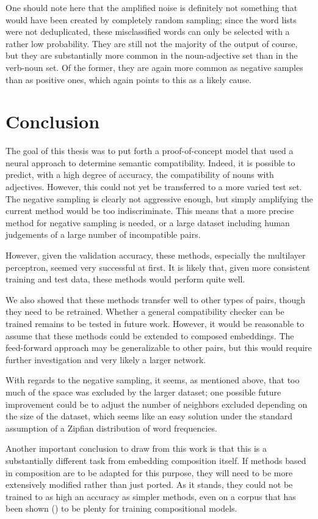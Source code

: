 \documentclass[a4paper, 12pt]{article}
\begin{document}
One should note here that the amplified noise is definitely not something that would have been created by completely random sampling; since the word lists were not deduplicated, these misclassified words can only be selected with a rather low probability. They are still not the majority of the output of course, but they are substantially more common in the noun-adjective set than in the verb-noun set. Of the former, they are again more common as negative samples than as positive ones, which again points to this as a likely cause.


\section{Conclusion}
The goal of this thesis was to put forth a proof-of-concept model that used a neural approach to determine semantic compatibility. Indeed, it is possible to predict, with a high degree of accuracy, the compatibility of nouns with adjectives. However, this could not yet be transferred to a more varied test set. The negative sampling is clearly not aggressive enough, but simply amplifying the current method would be too indiscriminate. This means that a more precise method for negative sampling is needed, or a large dataset including human judgements of a large number of incompatible pairs.

However, given the validation accuracy, these methods, especially the multilayer perceptron, seemed very successful at first. It is likely that, given more consistent training and test data, these methods would perform quite well.

We also showed that these methods transfer well to other types of pairs, though they need to be retrained. Whether a general compatibility checker can be trained remains to be tested in future work. However, it would be reasonable to assume that these methods could be extended to composed embeddings. The feed-forward approach may be generalizable to other pairs, but this would require further investigation and very likely a larger network.

With regards to the negative sampling, it seems, as mentioned above, that too much of the space was excluded by the larger dataset; one possible future improvement could be to adjust the number of neighbors excluded depending on the size of the dataset, which seems like an easy solution under the standard assumption of a Zipfian distribution of word frequencies.

Another important conclusion to draw from this work is that this is a substantially different task from embedding composition itself. If methods based in composition are to be adapted for this purpose, they will need to be more extensively modified rather than just ported. As it stands, they could not be trained to as high an accuracy as simpler methods, even on a corpus that has been shown (\cite{TSelect}) to be plenty for training compositional models.
\end{document}
